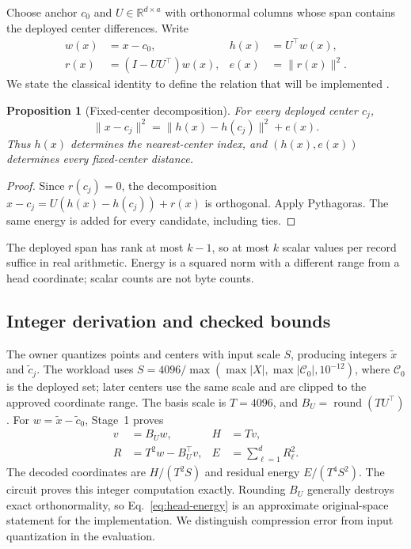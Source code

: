 \documentclass[5p,times,twocolumn]{elsarticle}
\theoremstyle{plain}
\newtheorem{proposition}[theorem]{Proposition}
\theoremstyle{definition}
\theoremstyle{remark}
\begin{document}
\par\endgroup
\begingroup\color{RevisionGreen}
Choose anchor $c_0$ and $U\in\mathbb R^{d\times a}$ with orthonormal columns whose span contains the deployed center differences. Write
\begin{align}
w(x)&=x-c_0,& h(x)&=U^\top w(x),\nonumber\\
r(x)&=(I-UU^\top)w(x),& e(x)&=\|r(x)\|^2.
\end{align}
We state the classical identity to define the relation that will be implemented \cite{feldman2013tiny,feldman2020tiny,cohen2015dimensionality}.
\begin{proposition}[Fixed-center decomposition]\label{prop:head-energy}
For every deployed center $c_j$,
\begin{equation}\label{eq:head-energy}
\|x-c_j\|^2=\|h(x)-h(c_j)\|^2+e(x).
\end{equation}
Thus $h(x)$ determines the nearest-center index, and $(h(x),e(x))$ determines every fixed-center distance.
\end{proposition}
\begin{proof}
Since $r(c_j)=0$, the decomposition $x-c_j=U(h(x)-h(c_j))+r(x)$ is orthogonal. Apply Pythagoras. The same energy is added for every candidate, including ties.
\end{proof}
The deployed span has rank at most $k-1$, so at most $k$ scalar values per record suffice in real arithmetic. Energy is a squared norm with a different range from a head coordinate; scalar counts are not byte counts.


\par\endgroup
\subsection{\textcolor{RevisionGreen}{Integer derivation and checked bounds}}\label{sec:protected-method}
\begingroup\color{RevisionGreen}
The owner quantizes points and centers with input scale $S$, producing integers $\widetilde x$ and $\widetilde c_j$. The workload uses $S=4096/\max(\max|X|,\max|\mathcal C_0|,10^{-12})$, where $\mathcal C_0$ is the deployed set; later centers use the same scale and are clipped to the approved coordinate range. The basis scale is $T=4096$, and $B_U=\operatorname{round}(TU^\top)$. For $w=\widetilde x-\widetilde c_0$, Stage~1 proves
\begin{align}
v&=B_Uw,& H&=Tv,\nonumber\\
R&=T^2w-B_U^\top v,& E&=\sum_{\ell=1}^d R_\ell^2.\label{eq:protected-integer}
\end{align}
The decoded coordinates are $H/(T^2S)$ and residual energy $E/(T^4S^2)$. The circuit proves this integer computation exactly. Rounding $B_U$ generally destroys exact orthonormality, so Eq.~\eqref{eq:head-energy} is an approximate original-space statement for the implementation. We distinguish compression error from input quantization in the evaluation.
\end{document}
